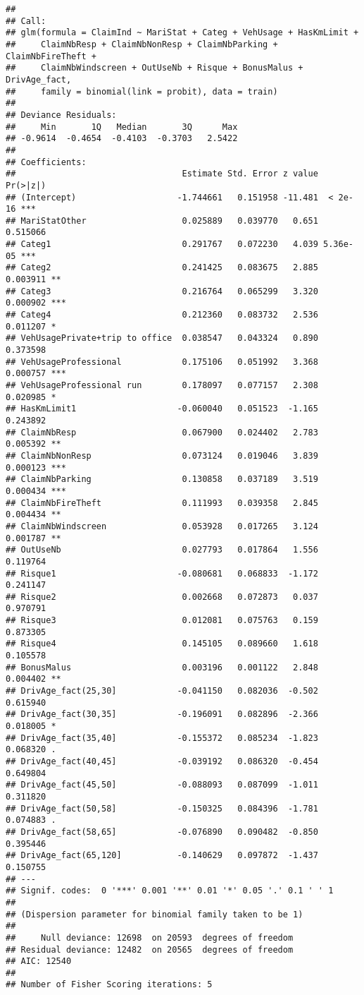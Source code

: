 \documentclass[
]{article}
\begin{document}
\begin{verbatim}
## 
## Call:
## glm(formula = ClaimInd ~ MariStat + Categ + VehUsage + HasKmLimit + 
##     ClaimNbResp + ClaimNbNonResp + ClaimNbParking + ClaimNbFireTheft + 
##     ClaimNbWindscreen + OutUseNb + Risque + BonusMalus + DrivAge_fact, 
##     family = binomial(link = probit), data = train)
## 
## Deviance Residuals: 
##     Min       1Q   Median       3Q      Max  
## -0.9614  -0.4654  -0.4103  -0.3703   2.5422  
## 
## Coefficients:
##                                 Estimate Std. Error z value Pr(>|z|)    
## (Intercept)                    -1.744661   0.151958 -11.481  < 2e-16 ***
## MariStatOther                   0.025889   0.039770   0.651 0.515066    
## Categ1                          0.291767   0.072230   4.039 5.36e-05 ***
## Categ2                          0.241425   0.083675   2.885 0.003911 ** 
## Categ3                          0.216764   0.065299   3.320 0.000902 ***
## Categ4                          0.212360   0.083732   2.536 0.011207 *  
## VehUsagePrivate+trip to office  0.038547   0.043324   0.890 0.373598    
## VehUsageProfessional            0.175106   0.051992   3.368 0.000757 ***
## VehUsageProfessional run        0.178097   0.077157   2.308 0.020985 *  
## HasKmLimit1                    -0.060040   0.051523  -1.165 0.243892    
## ClaimNbResp                     0.067900   0.024402   2.783 0.005392 ** 
## ClaimNbNonResp                  0.073124   0.019046   3.839 0.000123 ***
## ClaimNbParking                  0.130858   0.037189   3.519 0.000434 ***
## ClaimNbFireTheft                0.111993   0.039358   2.845 0.004434 ** 
## ClaimNbWindscreen               0.053928   0.017265   3.124 0.001787 ** 
## OutUseNb                        0.027793   0.017864   1.556 0.119764    
## Risque1                        -0.080681   0.068833  -1.172 0.241147    
## Risque2                         0.002668   0.072873   0.037 0.970791    
## Risque3                         0.012081   0.075763   0.159 0.873305    
## Risque4                         0.145105   0.089660   1.618 0.105578    
## BonusMalus                      0.003196   0.001122   2.848 0.004402 ** 
## DrivAge_fact(25,30]            -0.041150   0.082036  -0.502 0.615940    
## DrivAge_fact(30,35]            -0.196091   0.082896  -2.366 0.018005 *  
## DrivAge_fact(35,40]            -0.155372   0.085234  -1.823 0.068320 .  
## DrivAge_fact(40,45]            -0.039192   0.086320  -0.454 0.649804    
## DrivAge_fact(45,50]            -0.088093   0.087099  -1.011 0.311820    
## DrivAge_fact(50,58]            -0.150325   0.084396  -1.781 0.074883 .  
## DrivAge_fact(58,65]            -0.076890   0.090482  -0.850 0.395446    
## DrivAge_fact(65,120]           -0.140629   0.097872  -1.437 0.150755    
## ---
## Signif. codes:  0 '***' 0.001 '**' 0.01 '*' 0.05 '.' 0.1 ' ' 1
## 
## (Dispersion parameter for binomial family taken to be 1)
## 
##     Null deviance: 12698  on 20593  degrees of freedom
## Residual deviance: 12482  on 20565  degrees of freedom
## AIC: 12540
## 
## Number of Fisher Scoring iterations: 5
\end{verbatim}
\end{document}
